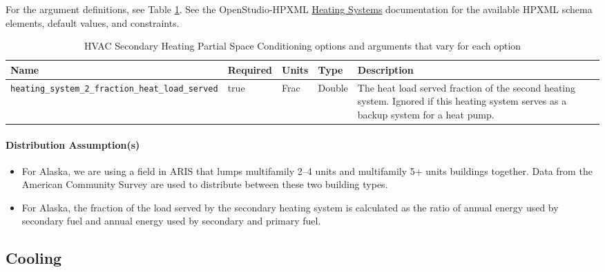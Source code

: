For the argument definitions, see Table \ref{table:arg_def_hvac_sec_par}. See the OpenStudio-HPXML \href{https://openstudio-hpxml.readthedocs.io/en/v1.8.1/workflow_inputs.html#hpxml-heating-systems}{Heating Systems} documentation for the available HPXML schema elements, default values, and constraints.

\begin{longtable}[]{|p{4cm}|p{1.5cm}|p{1.3cm}|p{1.1cm}|p{3.3cm}|}\caption{HVAC Secondary Heating Partial Space Conditioning options and arguments that vary for each option} \label{table:arg_def_hvac_sec_par} \\
\toprule\noalign{}
Name & Required & Units & Type &  Description \\
\midrule\noalign{}
\endhead
\bottomrule\noalign{}
\endlastfoot
\texttt{heating\_system\_2\_fraction\_heat\_load\_served} & true & Frac
& Double &  The heat load served fraction of the second heating system.
Ignored if this heating system serves as a backup system for a heat
pump. \\
\end{longtable}

\paragraph{Distribution Assumption(s)}

\begin{itemize}
    \item For Alaska, we are using a field in ARIS that lumps multifamily 2--4 units and multifamily 5+ units buildings together. Data from the American Community Survey are used to distribute between these two building types.
    \item For Alaska, the fraction of the load served by the secondary heating system is calculated as the ratio of annual energy used by secondary fuel and annual energy used by secondary and primary fuel.
\end{itemize}
 

\subsection{Cooling}
